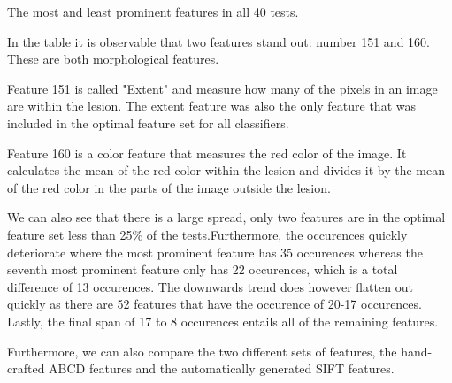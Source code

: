 \documentclass{kththesis}
\begin{document}
\begin{table}[h!]
  \begin{center}
    \caption{The most and least prominent features in all 40 tests.}
  \end{center}
\end{table}
\newpage
In the table it is observable that two features stand out: number 151 and 160. These are both morphological features.%

Feature 151 is called "Extent" and measure how many of the pixels in an image are within the lesion.
The extent feature was also the only feature that was included in the optimal feature set for all classifiers.

Feature 160 is a color feature that measures the red color of the image. It calculates the mean of the red color within the lesion and divides it by the mean of the red color in the parts of the image outside the lesion.

We can also see that there is a large spread, only two features are in the optimal feature set less than 25\% of the tests.Furthermore, the occurences quickly deteriorate where the most prominent feature has 35 occurences whereas the seventh most prominent feature only has 22 occurences, which is a total difference of 13 occurences. The downwards trend does however flatten out quickly as there are 52 features that have the occurence of 20-17 occurences. Lastly, the final span of 17 to 8 occurences entails all of the remaining features. 


Furthermore, we can also compare the two different sets of features, the hand-crafted ABCD features and the automatically generated SIFT features.
\end{document}
